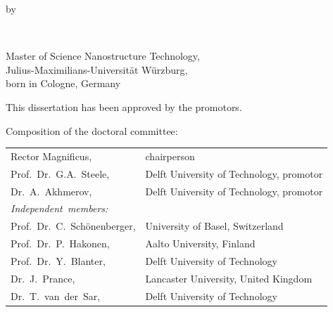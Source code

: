 \begin{titlepage}
\begin{center}
\bigskip
\bigskip

by

\bigskip
\bigskip

\makeatletter
{\Large\titlefont\bfseries\@firstname\ {\titleshape\@lastname}}
\makeatother

\bigskip
\bigskip

Master of Science Nanostructure Technology, \\
Julius-Maximilians-Universität Würzburg, \\
born in Cologne, Germany

\vspace*{2\bigskipamount}

\end{center}

\clearpage
\thispagestyle{empty}

\noindent This dissertation has been approved by the promotors.

\bigskip
\noindent Composition of the doctoral committee:

\medskip\noindent
\begin{tabular}{p{3.5cm}l}
    Rector Magnificus, & chairperson \\
    Prof.~Dr.~G.A.~Steele, & Delft University of Technology, promotor \\
    Dr.~A.~Akhmerov, & Delft University of Technology, promotor \\

    \medskip
    \mbox{\emph{Independent members:}} & \\
    
    Prof.~Dr.~C.~Schönenberger, & University of Basel, Switzerland \\
    
    Prof.~Dr.~P.~Hakonen, & Aalto University, Finland \\
    
    Prof.~Dr.~Y.~Blanter, & Delft University of Technology \\
    
    Dr.~J.~Prance, & Lancaster University, United Kingdom \\

    Dr.~T.~van~der~Sar, & Delft University of Technology \\
    

\end{tabular}
\end{titlepage}
